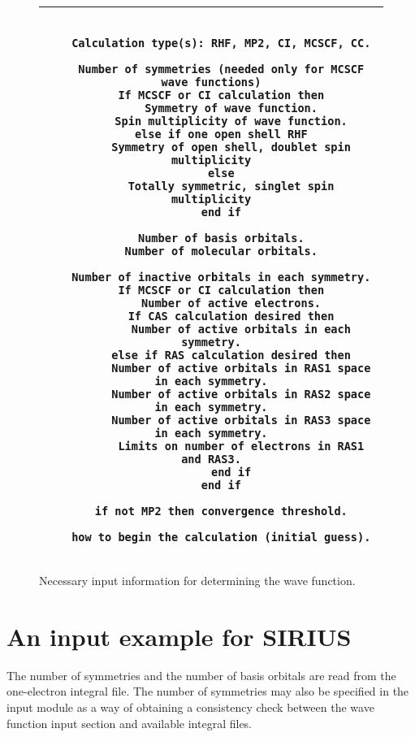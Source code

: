 \begin{figure}
    \newlength{\mpwidth}
    \settowidth{\mpwidth}{\tt M}
    \addtolength{\mpwidth}{65\mpwidth}
\begin{tabular}{|c|}
\hline
\begin{minipage}{\mpwidth}
\begin{verbatim}

   Calculation type(s): RHF, MP2, CI, MCSCF, CC.

   Number of symmetries (needed only for MCSCF wave functions)
   If MCSCF or CI calculation then
      Symmetry of wave function.
      Spin multiplicity of wave function.
   else if one open shell RHF
      Symmetry of open shell, doublet spin multiplicity
   else
      Totally symmetric, singlet spin multiplicity
   end if

   Number of basis orbitals.
   Number of molecular orbitals.

   Number of inactive orbitals in each symmetry.
   If MCSCF or CI calculation then
      Number of active electrons.
      If CAS calculation desired then
         Number of active orbitals in each symmetry.
      else if RAS calculation desired then
         Number of active orbitals in RAS1 space in each symmetry.
         Number of active orbitals in RAS2 space in each symmetry.
         Number of active orbitals in RAS3 space in each symmetry.
         Limits on number of electrons in RAS1 and RAS3.
      end if
   end if

   if not MP2 then convergence threshold.

   how to begin the calculation (initial guess).

\end{verbatim}
\end{minipage} \\ \hline
\end{tabular}
\vspace{0.5cm}
\caption{Necessary input information for determining the wave
function.}\label{fig-nec.inp.}
\end{figure}


\section{\label{sec:si-ex} An input example for SIRIUS}

\noindent
The number of symmetries and the number of basis orbitals are read from
the one-electron integral file.  The number of symmetries may also be
specified in the  input module as a way of
obtaining a consistency check between the wave function input section
and available integral files.


